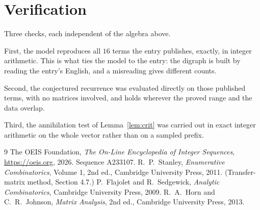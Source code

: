 \documentclass[11pt,a4paper]{article}
\theoremstyle{plain}
\theoremstyle{definition}
\begin{document}
\section{Verification}

Three checks, each independent of the algebra above.

First, the model reproduces all $16$ terms the entry publishes, exactly, in integer
arithmetic. This is what ties the model to the entry: the digraph is built by reading the
entry's English, and a misreading gives different counts.

Second, the conjectured recurrence was evaluated directly on those published terms, with no
matrices involved, and holds wherever the proved range and the data overlap.

Third, the annihilation test of Lemma~\ref{lem:crit} was carried out in exact integer
arithmetic on the whole vector rather than on a sampled prefix.

\begin{thebibliography}{9}
 The OEIS Foundation, \emph{The On-Line Encyclopedia of Integer
Sequences}, \url{https://oeis.org}, 2026. Sequence A233107.
 R.~P.~Stanley, \emph{Enumerative Combinatorics}, Volume 1, 2nd ed.,
Cambridge University Press, 2011. (Transfer-matrix method, Section 4.7.)
 P.~Flajolet and R.~Sedgewick, \emph{Analytic Combinatorics}, Cambridge
University Press, 2009.
 R.~A.~Horn and C.~R.~Johnson, \emph{Matrix Analysis}, 2nd ed., Cambridge
University Press, 2013.
\end{thebibliography}
\end{document}
